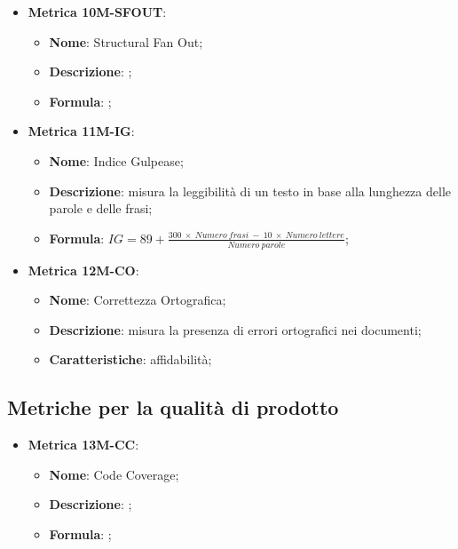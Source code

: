 \begin{itemize}
    \item \textbf{Metrica 10M-SFOUT}:
    \begin{itemize}
        \item \textbf{Nome}: Structural Fan Out;
        \item \textbf{Descrizione}: ;
        \item \textbf{Formula}: ;
    \end{itemize}
\end{itemize}

\begin{itemize}
    \item \textbf{Metrica 11M-IG}:
    \begin{itemize}
        \item \textbf{Nome}: Indice Gulpease;
        \item \textbf{Descrizione}: misura la leggibilità di un testo in base alla lunghezza delle parole e delle frasi;
        \item \textbf{Formula}: $IG = 89 + \frac{300 \:\times \:Numero\:frasi \:- \:10 \:\times\: Numero\:lettere}{Numero\:parole}$;
    \end{itemize}
\end{itemize}

\begin{itemize}
    \item \textbf{Metrica 12M-CO}:
    \begin{itemize}
        \item \textbf{Nome}: Correttezza Ortografica;
        \item \textbf{Descrizione}: misura la presenza di errori ortografici nei documenti;
        \item \textbf{Caratteristiche}: affidabilità;
    \end{itemize}
\end{itemize}

\subsection{Metriche per la qualità di prodotto}
\begin{itemize}
    \item \textbf{Metrica 13M-CC}:
    \begin{itemize}
        \item \textbf{Nome}: Code Coverage;
        \item \textbf{Descrizione}: ;
        \item \textbf{Formula}: ;
    \end{itemize}
\end{itemize}

